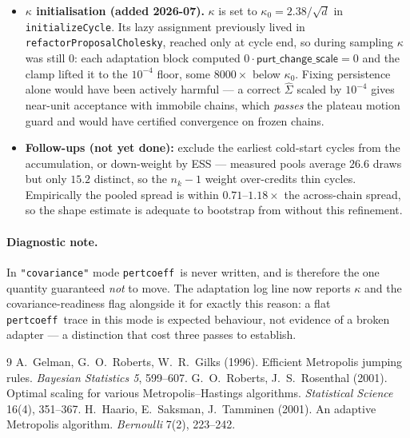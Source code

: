 \documentclass[11pt]{article}
\newcommand{\code}[1]{\texttt{\small #1}}
\newcommand{\param}[1]{\textsf{#1}}
\newcommand{\pc}{\code{pertcoeff}}
\begin{document}
\begin{itemize}[leftmargin=1.4em,nosep]
  legacy walk \emph{with adaptation switched off}. Bootstrapping is
  unaffected: one cycle's pool typically gives $W\approx 25 > 2d = 18$, so
  the kernel arms on cycle~2.
  \item \textbf{$\kappa$ initialisation (added 2026-07).} $\kappa$ is set to
  $\kappa_0 = 2.38/\sqrt d$ in \code{initializeCycle}. Its lazy assignment
  previously lived in \code{refactorProposalCholesky}, reached only at cycle
  end, so during sampling $\kappa$ was still $0$: each adaptation block
  computed $0\cdot\param{purt\_change\_scale}=0$ and the clamp lifted it to
  the $10^{-4}$ floor, some $8000\times$ below $\kappa_0$. Fixing
  persistence alone would have been actively harmful --- a correct
  $\hat\Sigma$ scaled by $10^{-4}$ gives near-unit acceptance with immobile
  chains, which \emph{passes} the plateau motion guard and would have
  certified convergence on frozen chains.
  \item \textbf{Follow-ups (not yet done):} exclude the earliest cold-start
  cycles from the accumulation, or down-weight by ESS --- measured pools
  average $26.6$ draws but only $15.2$ distinct, so the $n_k-1$ weight
  over-credits thin cycles. Empirically the pooled spread is within
  $0.71$--$1.18\times$ the across-chain spread, so the shape estimate is
  adequate to bootstrap from without this refinement.
\end{itemize}

\paragraph{Diagnostic note.} In \code{"covariance"} mode \pc\ is never
written, and is therefore the one quantity guaranteed \emph{not} to move.
The adaptation log line now reports $\kappa$ and the covariance-readiness
flag alongside it for exactly this reason: a flat \pc\ trace in this mode is
expected behaviour, not evidence of a broken adapter --- a distinction that
cost three passes to establish.

\begin{thebibliography}{9}
 A.~Gelman, G.~O.~Roberts, W.~R.~Gilks (1996).
  Efficient Metropolis jumping rules. \emph{Bayesian Statistics 5}, 599--607.
 G.~O.~Roberts, J.~S.~Rosenthal (2001).
  Optimal scaling for various Metropolis--Hastings algorithms.
  \emph{Statistical Science} 16(4), 351--367.
 H.~Haario, E.~Saksman, J.~Tamminen (2001).
  An adaptive Metropolis algorithm. \emph{Bernoulli} 7(2), 223--242.
\end{thebibliography}
\end{document}
